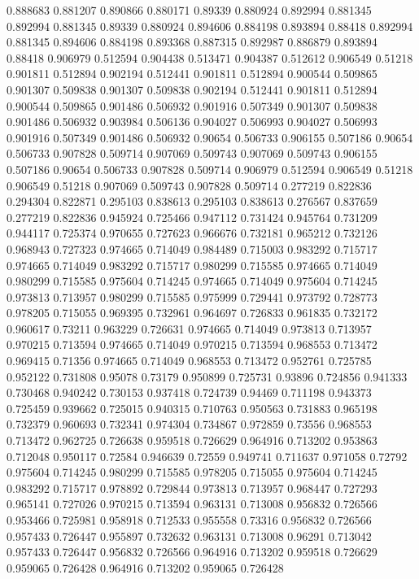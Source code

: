 0.888683 0.881207
0.890866 0.880171
0.89339 0.880924
0.892994 0.881345
0.892994 0.881345
0.89339 0.880924
0.894606 0.884198
0.893894 0.88418
0.892994 0.881345
0.894606 0.884198
0.893368 0.887315
0.892987 0.886879
0.893894 0.88418
0.906979 0.512594
0.904438 0.513471
0.904387 0.512612
0.906549 0.51218
0.901811 0.512894
0.902194 0.512441
0.901811 0.512894
0.900544 0.509865
0.901307 0.509838
0.901307 0.509838
0.902194 0.512441
0.901811 0.512894
0.900544 0.509865
0.901486 0.506932
0.901916 0.507349
0.901307 0.509838
0.901486 0.506932
0.903984 0.506136
0.904027 0.506993
0.904027 0.506993
0.901916 0.507349
0.901486 0.506932
0.90654 0.506733
0.906155 0.507186
0.90654 0.506733
0.907828 0.509714
0.907069 0.509743
0.907069 0.509743
0.906155 0.507186
0.90654 0.506733
0.907828 0.509714
0.906979 0.512594
0.906549 0.51218
0.906549 0.51218
0.907069 0.509743
0.907828 0.509714
0.277219 0.822836
0.294304 0.822871
0.295103 0.838613
0.295103 0.838613
0.276567 0.837659
0.277219 0.822836
0.945924 0.725466
0.947112 0.731424
0.945764 0.731209
0.944117 0.725374
0.970655 0.727623
0.966676 0.732181
0.965212 0.732126
0.968943 0.727323
0.974665 0.714049
0.984489 0.715003
0.983292 0.715717
0.974665 0.714049
0.983292 0.715717
0.980299 0.715585
0.974665 0.714049
0.980299 0.715585
0.975604 0.714245
0.974665 0.714049
0.975604 0.714245
0.973813 0.713957
0.980299 0.715585
0.975999 0.729441
0.973792 0.728773
0.978205 0.715055
0.969395 0.732961
0.964697 0.726833
0.961835 0.732172
0.960617 0.73211
0.963229 0.726631
0.974665 0.714049
0.973813 0.713957
0.970215 0.713594
0.974665 0.714049
0.970215 0.713594
0.968553 0.713472
0.969415 0.71356
0.974665 0.714049
0.968553 0.713472
0.952761 0.725785
0.952122 0.731808
0.95078 0.73179
0.950899 0.725731
0.93896 0.724856
0.941333 0.730468
0.940242 0.730153
0.937418 0.724739
0.94469 0.711198
0.943373 0.725459
0.939662 0.725015
0.940315 0.710763
0.950563 0.731883
0.965198 0.732379
0.960693 0.732341
0.974304 0.734867
0.972859 0.73556
0.968553 0.713472
0.962725 0.726638
0.959518 0.726629
0.964916 0.713202
0.953863 0.712048
0.950117 0.72584
0.946639 0.72559
0.949741 0.711637
0.971058 0.72792
0.975604 0.714245
0.980299 0.715585
0.978205 0.715055
0.975604 0.714245
0.983292 0.715717
0.978892 0.729844
0.973813 0.713957
0.968447 0.727293
0.965141 0.727026
0.970215 0.713594
0.963131 0.713008
0.956832 0.726566
0.953466 0.725981
0.958918 0.712533
0.955558 0.73316
0.956832 0.726566
0.957433 0.726447
0.955897 0.732632
0.963131 0.713008
0.96291 0.713042
0.957433 0.726447
0.956832 0.726566
0.964916 0.713202
0.959518 0.726629
0.959065 0.726428
0.964916 0.713202
0.959065 0.726428
